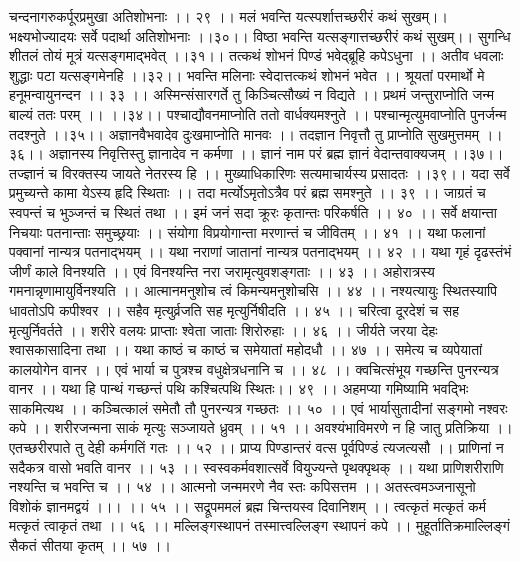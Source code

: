 चन्दनागरुकर्पूरप्रमुखा अतिशोभनाः ।। २९ ।।
मलं भवन्ति यत्स्पर्शात्तच्छरीरं कथं सुखम्।।
भक्ष्यभोज्यादयः सर्वे पदार्था अतिशोभनाः ।।३०।।
विष्ठा भवन्ति यत्सङ्गात्तच्छरीरं कथं सुखम्।।
सुगन्धि शीतलं तोयं मूत्रं यत्सङ्गमाद्भवेत् ।।३१।।
तत्कथं शोभनं पिण्डं भवेद्ब्रूहि कपेऽधुना ।।
अतीव धवलाः शुद्धाः पटा यत्सङ्गमेनहि ।।३२।।
भवन्ति मलिनाः स्वेदात्तत्कथं शोभनं भवेत ।।
श्रूयतां परमार्थो मे हनूमन्वायुनन्दन ।। ३३ ।।
अस्मिन्संसारगर्ते तु किञ्चित्सौख्यं न विद्यते ।।
प्रथमं जन्तुराप्नोति जन्म बाल्यं ततः परम् ।। ।।३४।।
पश्चाद्यौवनमाप्नोति ततो वार्धक्यमश्नुते ।।
पश्चान्मृत्युमवाप्नोति पुनर्जन्म तदश्नुते ।।३५।।
अज्ञानवैभवादेव दुःखमाप्नोति मानवः ।।
तदज्ञान निवृत्तौ तु प्राप्नोति सुखमुत्तमम् ।।३६।।
अज्ञानस्य निवृत्तिस्तु ज्ञानादेव न कर्मणा ।।
ज्ञानं नाम परं ब्रह्म ज्ञानं वेदान्तवाक्यजम् ।।३७।।
तज्ज्ञानं च विरक्तस्य जायते नेतरस्य हि ।।
मुख्याधिकारिणः सत्यमाचार्यस्य प्रसादतः ।।३९।।
यदा सर्वे प्रमुच्यन्ते कामा येऽस्य हृदि स्थिताः ।।
तदा मर्त्योऽमृतोऽत्रैव परं ब्रह्म समश्नुते ।। ३९ ।।
जाग्रतं च स्वपन्तं च भुञ्जन्तं च स्थितं तथा ।।
इमं जनं सदा क्रूरः कृतान्तः परिकर्षति ।। ४० ।।
सर्वे क्षयान्ता निचयाः पतनान्ताः समुच्छ्रयाः ।।
संयोगा विप्रयोगान्ता मरणान्तं च जीवितम् ।। ४१ ।।
यथा फलानां पक्वानां नान्यत्र पतनाद्भयम् ।।
यथा नराणां जातानां नान्यत्र पतनाद्भयम् ।। ४२ ।।
यथा गृहं दृढस्तंभं जीर्णं काले विनश्यति ।।
एवं विनश्यन्ति नरा जरामृत्युवशङ्गताः ।। ४३ ।।
अहोरात्रस्य गमनान्नृणामायुर्विनश्यति ।।
आत्मानमनुशोच त्वं किमन्यमनुशोचसि ।। ४४ ।।
नश्यत्यायुः स्थितस्यापि धावतोऽपि कपीश्वर ।।
सहैव मृत्युर्व्रजति सह मृत्युर्निषीदति ।। ४५ ।।
चरित्वा दूरदेशं च सह मृत्युर्निवर्तते ।।
शरीरे वलयः प्राप्ताः श्वेता जाताः शिरोरुहाः ।। ४६ ।।
जीर्यते जरया देहः श्वासकासादिना तथा ।।
यथा काष्ठं च काष्ठं च समेयातां महोदधौ ।। ४७ ।।
समेत्य च व्यपेयातां कालयोगेन वानर ।।
एवं भार्या च पुत्रश्च वधुक्षेत्रधनानि च ।। ४८ ।।
क्वचित्संभूय गच्छन्ति पुनरन्यत्र वानर ।।
यथा हि पान्थं गच्छन्तं पथि कश्चित्पथि स्थितः।। ४९ ।।
अहमप्या गमिष्यामि भवद्भिः साकमित्यथ ।।
कञ्चित्कालं समेतौ तौ पुनरन्यत्र गच्छतः ।। ५० ।।
एवं भार्यासुतादीनां सङ्गमो नश्वरः कपे ।।
शरीरजन्मना साकं मृत्युः सञ्जायते ध्रुवम् ।। ५१ ।।
अवश्यंभाविमरणे न हि जातु प्रतिक्रिया ।।
एतच्छरीरपाते तु देही कर्मगतिं गतः ।। ५२ ।।
प्राप्य पिण्डान्तरं वत्स पूर्वपिण्डं त्यजत्यसौ ।।
प्राणिनां न सदैकत्र वासो भवति वानर ।। ५३ ।।
स्वस्वकर्मवशात्सर्वे वियुज्यन्ते पृथक्पृथक् ।।
यथा प्राणिशरीराणि नश्यन्ति च भवन्ति च ।। ५४ ।।
आत्मनो जन्ममरणे नैव स्तः कपिसत्तम ।।
अतस्त्वमञ्जनासूनो विशोकं ज्ञानमद्वयं ।।। ।। ५५ ।।
सद्रूपममलं ब्रह्म चिन्तयस्व दिवानिशम् ।।
त्वत्कृतं मत्कृतं कर्म मत्कृतं त्वाकृतं तथा ।। ५६ ।।
मल्लिङ्गस्थापनं तस्मात्त्वल्लिङ्ग स्थापनं कपे ।।
मुहूर्तातिक्रमाल्लिङ्गं सैकतं सीतया कृतम् ।। ५७ ।।

